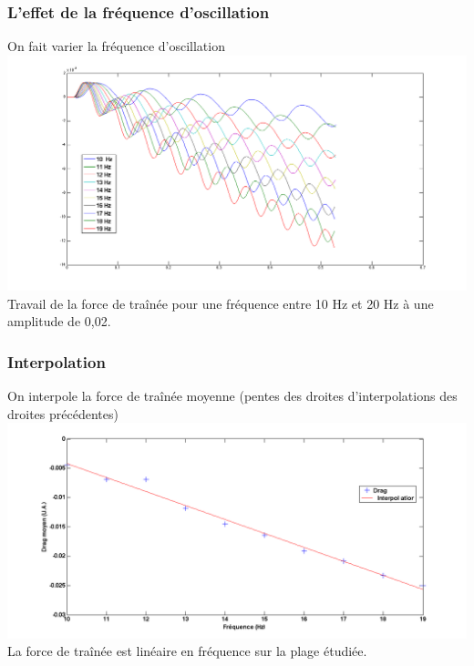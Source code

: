 \documentclass{beamer}
\begin{document}
 	\begin{frame}
 		\frametitle{L'effet de la fréquence d'oscillation}
 			On fait varier la fréquence d'oscillation
 			\centering \includegraphics[width= 0.8 \linewidth]{freq0,02.png}\\
 			Travail de la force de traînée pour une fréquence entre 10 Hz et 20 Hz à une amplitude de 0,02\degre.
 	\end{frame}
 	
 	\begin{frame}
 		\frametitle{Interpolation}
 		On interpole la force de traînée moyenne (pentes des droites d'interpolations des droites précédentes)
 		\centering \includegraphics[width= 0.8 \linewidth]{modulationfreq.png} \\
 		La force de traînée est linéaire en fréquence sur la plage étudiée.
 	\end{frame}
\end{document}
